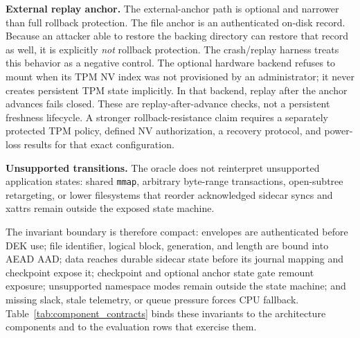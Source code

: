 \noindent\textbf{External replay anchor.}
The external-anchor path is optional and narrower than full rollback protection.  The file anchor is an authenticated on-disk record.  Because an attacker able to restore the backing directory can restore that record as well, it is explicitly \emph{not} rollback protection.  The crash/replay harness treats this behavior as a negative control.  The optional hardware backend refuses to mount when its TPM NV index was not provisioned by an administrator; it never creates persistent TPM state implicitly.  In that backend, replay after the anchor advances fails closed.  These are replay-after-advance checks, not a persistent freshness lifecycle.  A stronger rollback-resistance claim requires a separately protected TPM policy, defined NV authorization, a recovery protocol, and power-loss results for that exact configuration.

\noindent\textbf{Unsupported transitions.}
The oracle does not reinterpret unsupported application states: shared \texttt{mmap}, arbitrary byte-range transactions, open-subtree retargeting, or lower filesystems that reorder acknowledged sidecar syncs and xattrs remain outside the exposed state machine.

The invariant boundary is therefore compact: envelopes are authenticated before DEK use; file identifier, logical block, generation, and length are bound into AEAD AAD; data reaches durable sidecar state before its journal mapping and checkpoint expose it; checkpoint and optional anchor state gate remount exposure; unsupported namespace modes remain outside the state machine; and missing slack, stale telemetry, or queue pressure forces CPU fallback.  Table~\ref{tab:component_contracts} binds these invariants to the architecture components and to the evaluation rows that exercise them.
